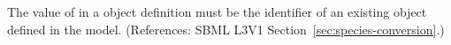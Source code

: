 The value of  in a \Species object definition must
be the identifier of an existing \Parameter object defined in the model.
(References: SBML L3V1 Section~\ref{sec:species-conversion}.)
